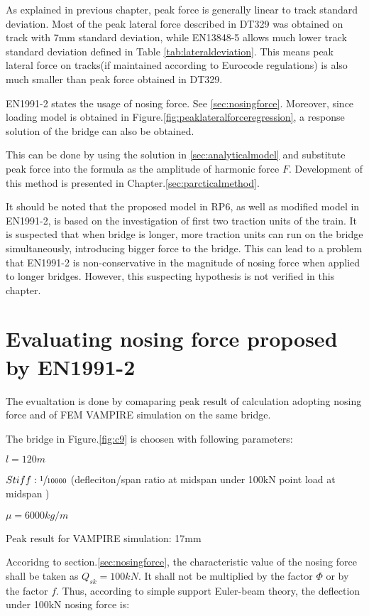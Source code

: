 As explained in previous chapter, peak force is generally linear to track standard deviation. Most of the peak lateral force described in DT329 was obtained on track with 7mm standard deviation, while EN13848-5\citet{13848} allows much lower track standard deviation defined in Table \ref{tab:lateraldeviation}. This means peak lateral force on tracks(if maintained according to Eurocode regulations) is also much smaller than peak force obtained in DT329. 

EN1991-2 states the usage of nosing force. See \ref{sec:nosingforce}. Moreover, since loading model is obtained in Figure.\ref{fig:peaklateralforceregression}, a response solution of the bridge can also be obtained. 

This can be done by using the solution in \ref{sec:analyticalmodel} and substitute peak force into the formula as the amplitude of harmonic force $F$. Development of this method is presented in Chapter.\ref{sec:parcticalmethod}. 
 
It should be noted that the proposed model in RP6, as well as modified model in EN1991-2, is based on the investigation of first two traction units of the train. It is suspected that when bridge is longer, more traction units can run on the bridge simultaneously, introducing bigger force to the bridge. This can lead to a problem that EN1991-2 is non-conservative in the magnitude of nosing force when applied to longer bridges. However, this suspecting hypothesis is not verified in this chapter.  

\section{Evaluating nosing force proposed by EN1991-2}
The evualtation is done by comaparing peak result of calculation adopting nosing force and of FEM VAMPIRE simulation on the same bridge.

The bridge in Figure.\ref{fig:c9} is choosen with following parameters:

$l = 120m$

$Stiff: \sfrac{1}{10000}$  (defleciton/span ratio at midspan under 100kN point load at midspan )

$\mu = 6000kg/m$

Peak result for VAMPIRE simulation: 17mm

Accoridng to section.\ref{sec:nosingforce}, the characteristic value of the nosing force shall be taken as $Q_{sk} = 100kN$. It shall not be multiplied by the factor $\Phi$ or by the factor $f$. Thus, according to simple support Euler-beam theory, the deflection under 100kN nosing force is:


